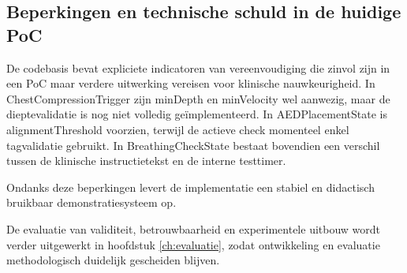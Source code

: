 \subsection{Beperkingen en technische schuld in de huidige PoC}

De codebasis bevat expliciete indicatoren van vereenvoudiging die zinvol zijn in een PoC maar verdere uitwerking vereisen voor klinische nauwkeurigheid. In ChestCompressionTrigger zijn minDepth en minVelocity wel aanwezig, maar de dieptevalidatie is nog niet volledig geïmplementeerd. In AEDPlacementState is alignmentThreshold voorzien, terwijl de actieve check momenteel enkel tagvalidatie gebruikt. In BreathingCheckState bestaat bovendien een verschil tussen de klinische instructietekst en de interne testtimer.

Ondanks deze beperkingen levert de implementatie een stabiel en didactisch bruikbaar demonstratiesysteem op.

De evaluatie van validiteit, betrouwbaarheid en experimentele uitbouw wordt verder uitgewerkt in hoofdstuk \ref{ch:evaluatie}, zodat ontwikkeling en evaluatie methodologisch duidelijk gescheiden blijven.

